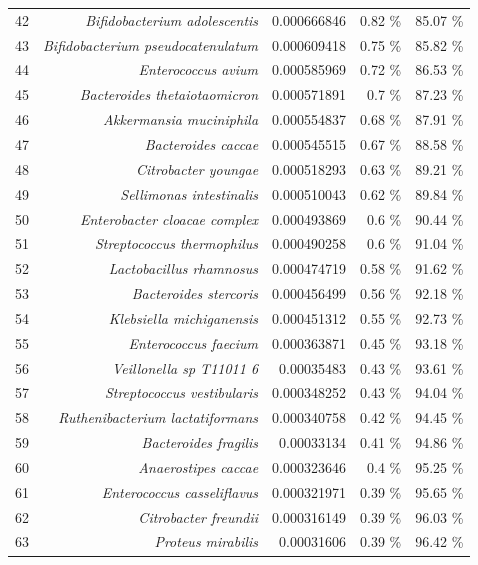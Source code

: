 \documentclass{article}
\begin{document}
\begin{table}[h]
\begin{centering}
\begin{tabular}{|r|r|r|r|r|}
      42 & \textit{Bifidobacterium adolescentis} & 0.000666846 & 0.82 \% & 85.07 \% \\
      43 & \textit{Bifidobacterium pseudocatenulatum} & 0.000609418 & 0.75 \% & 85.82 \% \\
      44 & \textit{Enterococcus avium} & 0.000585969 & 0.72 \% & 86.53 \% \\
      45 & \textit{Bacteroides thetaiotaomicron} & 0.000571891 & 0.7 \% & 87.23 \% \\
      46 & \textit{Akkermansia muciniphila} & 0.000554837 & 0.68 \% & 87.91 \% \\
      47 & \textit{Bacteroides caccae} & 0.000545515 & 0.67 \% & 88.58 \% \\
      48 & \textit{Citrobacter youngae} & 0.000518293 & 0.63 \% & 89.21 \% \\
      49 & \textit{Sellimonas intestinalis} & 0.000510043 & 0.62 \% & 89.84 \% \\
      50 & \textit{Enterobacter cloacae complex} & 0.000493869 & 0.6 \% & 90.44 \% \\
      51 & \textit{Streptococcus thermophilus} & 0.000490258 & 0.6 \% & 91.04 \% \\
      52 & \textit{Lactobacillus rhamnosus} & 0.000474719 & 0.58 \% & 91.62 \% \\
      53 & \textit{Bacteroides stercoris} & 0.000456499 & 0.56 \% & 92.18 \% \\
      54 & \textit{Klebsiella michiganensis} & 0.000451312 & 0.55 \% & 92.73 \% \\
      55 & \textit{Enterococcus faecium} & 0.000363871 & 0.45 \% & 93.18 \% \\
      56 & \textit{Veillonella sp T11011 6} & 0.00035483 & 0.43 \% & 93.61 \% \\
      57 & \textit{Streptococcus vestibularis} & 0.000348252 & 0.43 \% & 94.04 \% \\
      58 & \textit{Ruthenibacterium lactatiformans} & 0.000340758 & 0.42 \% & 94.45 \% \\
      59 & \textit{Bacteroides fragilis} & 0.00033134 & 0.41 \% & 94.86 \% \\
      60 & \textit{Anaerostipes caccae} & 0.000323646 & 0.4 \% & 95.25 \% \\
      61 & \textit{Enterococcus casseliflavus} & 0.000321971 & 0.39 \% & 95.65 \% \\
      62 & \textit{Citrobacter freundii} & 0.000316149 & 0.39 \% & 96.03 \% \\
      63 & \textit{Proteus mirabilis} & 0.00031606 & 0.39 \% & 96.42 \% \\

\end{tabular}
\end{centering}
\end{table}
\end{document}
